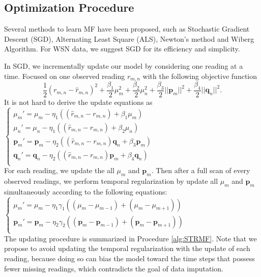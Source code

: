 \subsection{Optimization Procedure}
\label{optimation_procedure}
Several methods to learn MF have been proposed, such as Stochastic Gradient Descent (SGD)\cite{koren2009matrix,chih2008large}, Alternating Least Square (ALS)\cite{koren2009matrix,zhou2008large}, Newton's method\cite{buchanan2005damped} and Wiberg Algorithm\cite{okatani2007wiberg}.
For WSN data, we suggest SGD for its efficiency and simplicity. 

In SGD, we incrementally update our model by considering one reading at a time.
Focused on one observed reading $r_{m,n}$ with the following objective function
\begin{equation*} \frac{1}{2}(r_{m,n} - \hat{r}_{m,n})^2 + \frac{\beta_1}{2}\mu_m^2 + \frac{\beta_2}{2}\mu_n^2 + \frac{\beta_3}{2}||\mathbf{p}_m||^2 + \frac{\beta_4}{2}||\mathbf{q}_n||^2.\end{equation*}
It is not hard to derive the update equations as \\
\indent	$\begin{cases}
	\mu_m' = \mu_m - \eta_1 ((\hat{r}_{m,n}-r_{m,n}) + \beta_1 \mu_m) \\
	\mu_n' = \mu_n - \eta_1 ((\hat{r}_{m,n}-r_{m,n}) + \beta_2 \mu_n) \\
	\mathbf{p}_{m}' = \mathbf{p}_{m} - \eta_2 ((\hat{r}_{m,n}-r_{m,n})\mathbf{q}_{n} + \beta_3 \mathbf{p}_{m})\\
	\mathbf{q}_{n}' = \mathbf{q}_{n} - \eta_2 ((\hat{r}_{m,n}-r_{m,n})\mathbf{p}_{m} + \beta_4 \mathbf{q}_{n})\\
	\end{cases}$\\
For each reading, we update the all $\mu_m$ and $\mathbf{p}_m$. Then after a full scan of every observed readings, we perform temporal regularization by update all $\mu_m$ and $\mathbf{p}_m$ simultaneously according to the following equations:\\
\indent $\begin{cases}
	\mu_m' = \mu_m - \eta_1 \gamma_1((\mu_m-\mu_{m-1})+(\mu_m-\mu_{m+1}))\\
	\mathbf{p}_{m}' = \mathbf{p}_{m} - \eta_2 \gamma_2((\mathbf{p}_{m}-\mathbf{p}_{m-1})+(\mathbf{p}_{m}-\mathbf{p}_{m+1}))\\
	\end{cases}$\\

The updating procedure is summarized in Procedure \ref{alg:STRMF}. Note that we propose to avoid updating the temporal regularization with the update of each reading, because doing so can bias the model toward the time steps that possess fewer missing readings, which contradicts the goal of data imputation. 

